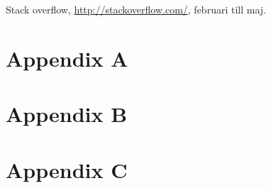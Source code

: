 \documentclass[a4paper,12pt,fleqn]{article}
\begin{document}
Stack overflow, \url{http://stackoverflow.com/}, februari till maj.



\newpage
\appendix
\pagestyle{empty}
\section*{Appendix A}
\label{komuppg.}

\section*{Appendix B}

\section*{Appendix C}


%

%


\end{document}
